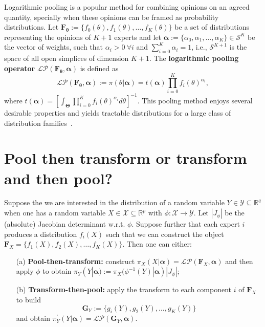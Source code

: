 \documentclass[a4paper, notitlepage, 10pt]{article}
\begin{document}
Logarithmic pooling is a popular method for combining opinions on an agreed quantity, specially when these opinions can be framed as probability distributions.
Let $\mathbf{F_\theta} := \{f_0(\theta), f_1(\theta), \ldots, f_K(\theta)\}$ be a set of distributions representing the opinions of $K + 1$ experts and let $\boldsymbol\alpha :=\{\alpha_0, \alpha_1, \ldots, \alpha_K \} \in \mathcal{S}^K$ be the vector of weights, such that $\alpha_i > 0\: \forall i$ and $\sum_{i=0}^K \alpha_i = 1$, i.e., $\mathcal{S}^{K + 1}$ is the space of all open simplices of dimension $K + 1$.
The \textbf{logarithmic pooling operator} $\mathcal{LP}(\mathbf{F_\theta}, \boldsymbol\alpha)$ is defined as
\begin{equation}
\label{eq:logpool}
 \mathcal{LP}(\mathbf{F_\theta}, \boldsymbol\alpha) :=  \pi(\theta | \boldsymbol\alpha) = t(\boldsymbol\alpha) \prod_{i=0}^K f_i(\theta)^{\alpha_i},
\end{equation}
where $t(\boldsymbol\alpha) = \left[ \int_{\boldsymbol\Theta}\prod_{i=0}^K f_i(\theta)^{\alpha_i}d\theta \right]^{-1}$.
This pooling method enjoys several desirable properties and yields tractable distributions for a large class of distribution families~\citep{genest1984,genest1986A,Carvalho2019}.

\section*{Pool then transform or transform and then pool?}

Suppose the we are interested in the distribution of a random variable $Y \in \mathcal{Y}\subseteq \mathbb{R}^q$  when one has a random variable $X \in \mathcal{X} \subseteq \mathbb{R}^p$ with $\phi : \mathcal{X} \to \mathcal{Y}$.
Let $|J_\phi|$ be the (absolute) Jacobian determinant w.r.t. $\phi$.
Suppose further that each expert $i$ produces a distribution $f_i(X)$ such that we can construct the object $\mathbf{F}_X = \{f_1(X), f_2(X), \ldots, f_K(X) \}$.
Then one can either:
\begin{itemize}
 \item[(a)] \textbf{Pool-then-transform:} construct $\pi_X(X | \boldsymbol \alpha) = \mathcal{LP}(\mathbf{F}_X, \boldsymbol \alpha)$ and then apply $\phi$ to obtain $\pi_Y(Y | \boldsymbol \alpha) := \pi_X( \phi^{-1}(Y)| \boldsymbol\alpha) |J_\phi|$;
 \item[(b)] \textbf{Transform-then-pool:} apply the transform to each component $i$ of $\mathbf{F}_X$ to build
 \[\mathbf{G}_{Y}:= \{g_i(Y), g_2(Y), \ldots, g_K(Y)\} \]
 and obtain $\pi_Y^{\prime}(Y |  \boldsymbol \alpha) = \mathcal{LP}(\mathbf{G}_{Y},  \boldsymbol \alpha)$.
\end{itemize}
\end{document}
